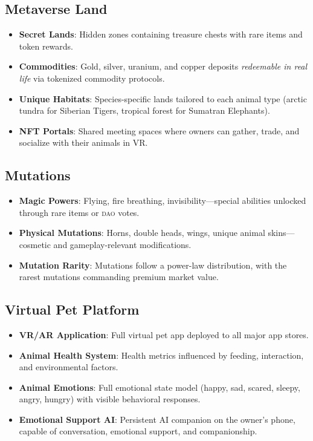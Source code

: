 \documentclass[11pt,letterpaper]{article}
\newcommand{\DAO}{\textsc{dao}}
\begin{document}
\subsection{Metaverse Land}

\begin{itemize}
    \item \textbf{Secret Lands}: Hidden zones containing treasure chests with rare items and token rewards.
    \item \textbf{Commodities}: Gold, silver, uranium, and copper deposits \emph{redeemable in real life} via tokenized commodity protocols.
    \item \textbf{Unique Habitats}: Species-specific lands tailored to each animal type (arctic tundra for Siberian Tigers, tropical forest for Sumatran Elephants).
    \item \textbf{NFT Portals}: Shared meeting spaces where owners can gather, trade, and socialize with their animals in VR.
\end{itemize}

\subsection{Mutations}

\begin{itemize}
    \item \textbf{Magic Powers}: Flying, fire breathing, invisibility---special abilities unlocked through rare items or \DAO{} votes.
    \item \textbf{Physical Mutations}: Horns, double heads, wings, unique animal skins---cosmetic and gameplay-relevant modifications.
    \item \textbf{Mutation Rarity}: Mutations follow a power-law distribution, with the rarest mutations commanding premium market value.
\end{itemize}

\subsection{Virtual Pet Platform}

\begin{itemize}
    \item \textbf{VR/AR Application}: Full virtual pet app deployed to all major app stores.
    \item \textbf{Animal Health System}: Health metrics influenced by feeding, interaction, and environmental factors.
    \item \textbf{Animal Emotions}: Full emotional state model (happy, sad, scared, sleepy, angry, hungry) with visible behavioral responses.
    \item \textbf{Emotional Support AI}: Persistent AI companion on the owner's phone, capable of conversation, emotional support, and companionship.
\end{itemize}
\end{document}
